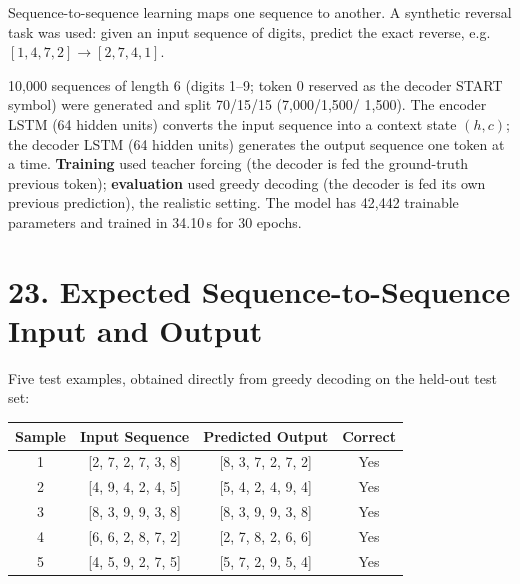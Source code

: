 \documentclass[10pt]{article}
\begin{document}
Sequence-to-sequence learning maps one sequence to another. A synthetic
reversal task was used: given an input sequence of digits, predict the
exact reverse, e.g.\ $[1,4,7,2]\rightarrow[2,7,4,1]$.

\begin{center}
\end{center}

10{,}000 sequences of length 6 (digits 1--9; token 0 reserved as the
decoder START symbol) were generated and split 70/15/15 (7{,}000/1{,}500/
1{,}500). The encoder LSTM (64 hidden units) converts the input sequence
into a context state $(h,c)$; the decoder LSTM (64 hidden units) generates
the output sequence one token at a time. \textbf{Training} used teacher
forcing (the decoder is fed the ground-truth previous token); \textbf{
evaluation} used greedy decoding (the decoder is fed its own previous
prediction), the realistic setting. The model has 42{,}442 trainable
parameters and trained in 34.10\,s for 30 epochs.

\section*{23. Expected Sequence-to-Sequence Input and Output}

Five test examples, obtained directly from greedy decoding on the held-out
test set:

\begin{center}
\begin{tabular}{|c|c|c|c|}
\hline
Sample & Input Sequence & Predicted Output & Correct\\
\hline
1 & [2, 7, 2, 7, 3, 8] & [8, 3, 7, 2, 7, 2] & Yes\\
2 & [4, 9, 4, 2, 4, 5] & [5, 4, 2, 4, 9, 4] & Yes\\
3 & [8, 3, 9, 9, 3, 8] & [8, 3, 9, 9, 3, 8] & Yes\\
4 & [6, 6, 2, 8, 7, 2] & [2, 7, 8, 2, 6, 6] & Yes\\
5 & [4, 5, 9, 2, 7, 5] & [5, 7, 2, 9, 5, 4] & Yes\\
\hline
\end{tabular}
\end{center}
\end{document}
